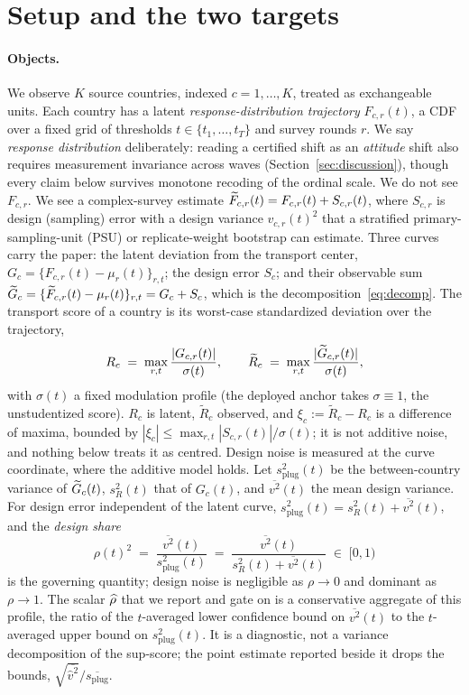 \section{Setup and the two targets}\label{sec:setup}

\paragraph{Objects.} We observe $K$ source countries, indexed $c=1, \dots, K$,
treated as exchangeable units. Each country has a latent \emph{response-distribution
trajectory} $F_{c, r}(t)$, a CDF over a fixed grid of thresholds
$t\in\{t_1, \dots, t_T\}$ and survey rounds $r$. We say \emph{response
distribution} deliberately: reading a certified shift as an \emph{attitude}
shift also requires measurement invariance across waves
(Section~\ref{sec:discussion}), though every claim below survives monotone
recoding of the ordinal scale. We do not see $F_{c, r}$. We see a
complex-survey estimate $\widetilde{F}_{c, r}(t)=F_{c, r}(t)+S_{c, r}(t)$, where
$S_{c, r}$ is design (sampling) error with a design variance $v_{c, r}(t)^2$
that a stratified primary-sampling-unit (PSU) or replicate-weight bootstrap
can estimate. Three curves carry the paper: the latent deviation from the
transport center, $G_c=\{F_{c,r}(t)-\mu_r(t)\}_{r,t}$; the design error
$S_c$; and their observable sum
$\widetilde{G}_c=\{\widetilde{F}_{c,r}(t)-\mu_r(t)\}_{r,t}=G_c+S_c$, which is the
decomposition~\eqref{eq:decomp}. The transport score of a country is its
worst-case standardized deviation over the trajectory,
\[
R_c \;=\; \max_{r, t}\frac{|G_{c, r}(t)|}{\sigma(t)},
\qquad
\widetilde{R}_c \;=\; \max_{r, t}\frac{|\widetilde{G}_{c, r}(t)|}{\sigma(t)},
\]
with $\sigma(t)$ a fixed modulation profile (the deployed anchor takes
$\sigma\equiv1$, the unstudentized score). $R_c$ is latent,
$\widetilde R_c$ observed, and $\xi_c:=\widetilde R_c-R_c$ is a difference
of maxima, bounded by
$|\xi_c|\le\max_{r,t}|S_{c,r}(t)|/\sigma(t)$; it is not additive noise, and
nothing below treats it as centred. Design noise is measured at the curve
coordinate, where the additive model holds. Let $s_{\mathrm{plug}}^2(t)$ be the between-country variance of $\widetilde{G}_c(t)$,
$s_R^2(t)$ that of $G_c(t)$, and $\overline{v^2}(t)$ the mean design
variance. For design error independent of the latent curve,
$s_{\mathrm{plug}}^2(t)=s_R^2(t)+\overline{v^2}(t)$, and the \emph{design
share}
\[
\rho(t)^2 \;=\; \frac{\overline{v^2}(t)}{s_{\mathrm{plug}}^2(t)}
\;=\;\frac{\overline{v^2}(t)}{s_R^2(t)+\overline{v^2}(t)}\;\in\;[0,1)
\]
is the governing quantity; design noise is negligible as $\rho\to0$ and
dominant as $\rho\to1$. The scalar
$\widehat{\rho}$ that we report and gate on is a conservative aggregate of this
profile, the ratio of the $t$-averaged lower confidence bound on
$\overline{v^2}(t)$ to the $t$-averaged upper bound on
$s_{\mathrm{plug}}^2(t)$. It is a diagnostic, not a variance decomposition
of the sup-score; the point estimate reported beside it drops the bounds, $\sqrt{\overline{\widehat v^2}}/\overline{s_{\mathrm{plug}}}$.

